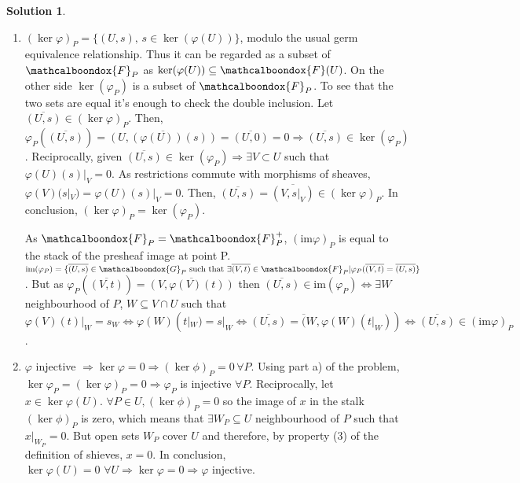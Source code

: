 \documentclass[12pt]{article}
\newcommand{\imp}{\ensuremath{\Rightarrow}}
\newcommand{\ima}{\ensuremath{\text{im}}}
\theoremstyle{definition}
\newtheorem*{sol}{Solution}
\newcommand{\sF}{\ensuremath{\mathcalboondox{F}}}
\newcommand{\sG}{\ensuremath{\mathcalboondox{G}}}
\begin{document}
\begin{sol}
	\begin{enumerate}[label=\alph*)]
		\item $(\ker \varphi)_P = \{(U,s), \, s \in \ker(\varphi(U))\}$, modulo the usual germ equivalence relationship. Thus it can be regarded as a subset of $\sF_P$ as $\ker(\varphi(U)) \subseteq \sF(U)$. On the other side $\ker(\varphi_P)$ is a subset of $\sF_P$. To see that the two sets are equal it's enough to check the double inclusion. Let $\overline{(U,s)} \in (\ker \varphi)_P$. Then, $\varphi_P(\overline{(U,s)}) = \overline{(U, (\varphi(U))(s))} = \overline{(U,0)} = 0 \imp \overline{(U,s)} \in \ker(\varphi_P)$. Reciprocally, given $\overline{(U,s)} \in \ker(\varphi_P) \imp \exists V \subset U$ such that $\varphi(U)(s)|_V = 0$. As restrictions commute with morphisms of sheaves, $ \varphi(V)(s|_V) = \varphi(U)(s)|_V = 0$. Then, $\overline{(U,s)} = \overline{(V,s|_V)} \in (\ker\varphi)_P$. In conclusion, $(\ker \varphi)_P = \ker(\varphi_P)$.

		As $\sF_P = \sF^{+}_P$, $(\ima \varphi)_P$ is equal to the stack of the presheaf image at point P. $\ima (\varphi_P) = \{\overline{(U,s)} \in \sG_P \text{ such that } \exists \overline{(V,t)} \in \sF_P | \varphi_P(\overline{(V,t)} = \overline{(U,s)}\}$. But as $\varphi_P(\overline{(V,t)}) = \overline{(V, \varphi(V)(t))}$ then $\overline{(U,s)} \in \ima (\varphi_P) \iff \exists W$ neighbourhood of $P$, $W \subseteq V \cap U$ such that $\varphi(V)(t)|_W = s_W \iff \varphi(W)(t|_W) = s|_W \iff \overline{(U,s)} = \overline(W,\varphi(W)(t|_W)) \iff \overline{(U,s)} \in (\ima \varphi)_P$.

		\item $\varphi$ injective $\imp \ker \varphi = 0 \imp (\ker \phi)_P = 0 \, \forall P$. Using part a) of the problem, $\ker \varphi_P = (\ker \varphi)_P = 0 \imp \varphi_P$ is injective $\forall P$. Reciprocally, let $x \in \ker \varphi(U)$. $\forall P \in U, (\ker \phi)_P = 0$ so the image of $x$ in the stalk $(\ker \phi)_P$ is zero, which means that $\exists W_P \subseteq U$ neighbourhood of $P$ such that $x|_{W_P} = 0$. But open sets $W_P$ cover $U$ and therefore, by property (3) of the definition of shieves, $x = 0$. In conclusion, $\ker \varphi(U) = 0 \, \, \forall U \imp \ker \varphi = 0 \imp \varphi$ injective.


\end{enumerate}
\end{sol}
\end{document}
